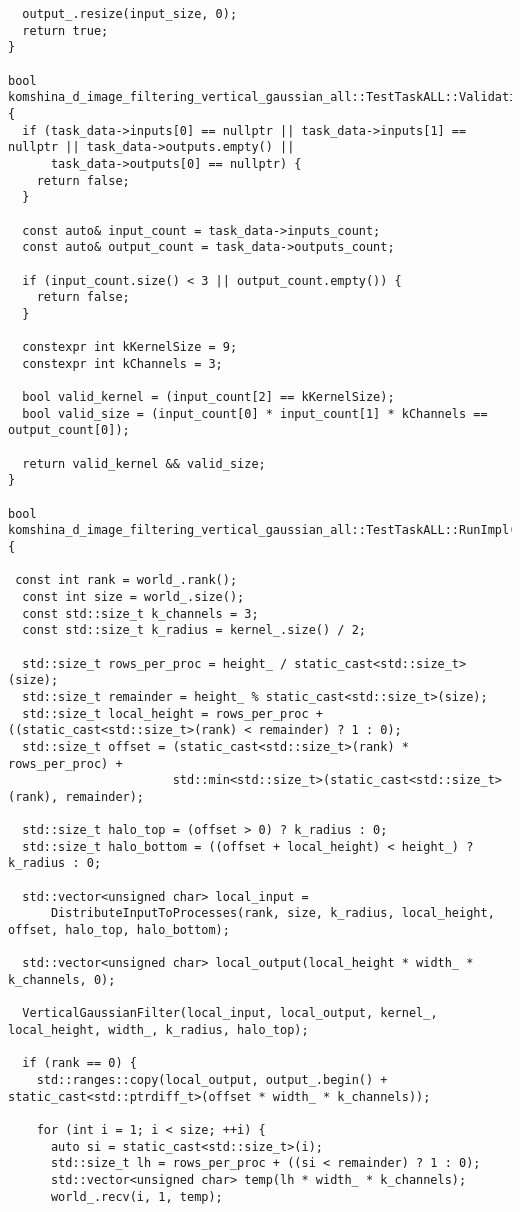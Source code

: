 \documentclass[12pt]{article}
\begin{document}
\begin{lstlisting}
  output_.resize(input_size, 0);
  return true;
}

bool komshina_d_image_filtering_vertical_gaussian_all::TestTaskALL::ValidationImpl() {
  if (task_data->inputs[0] == nullptr || task_data->inputs[1] == nullptr || task_data->outputs.empty() ||
      task_data->outputs[0] == nullptr) {
    return false;
  }

  const auto& input_count = task_data->inputs_count;
  const auto& output_count = task_data->outputs_count;

  if (input_count.size() < 3 || output_count.empty()) {
    return false;
  }

  constexpr int kKernelSize = 9;
  constexpr int kChannels = 3;

  bool valid_kernel = (input_count[2] == kKernelSize);
  bool valid_size = (input_count[0] * input_count[1] * kChannels == output_count[0]);

  return valid_kernel && valid_size;
}

bool komshina_d_image_filtering_vertical_gaussian_all::TestTaskALL::RunImpl() {

 const int rank = world_.rank();
  const int size = world_.size();
  const std::size_t k_channels = 3;
  const std::size_t k_radius = kernel_.size() / 2;

  std::size_t rows_per_proc = height_ / static_cast<std::size_t>(size);
  std::size_t remainder = height_ % static_cast<std::size_t>(size);
  std::size_t local_height = rows_per_proc + ((static_cast<std::size_t>(rank) < remainder) ? 1 : 0);
  std::size_t offset = (static_cast<std::size_t>(rank) * rows_per_proc) +
                       std::min<std::size_t>(static_cast<std::size_t>(rank), remainder);

  std::size_t halo_top = (offset > 0) ? k_radius : 0;
  std::size_t halo_bottom = ((offset + local_height) < height_) ? k_radius : 0;

  std::vector<unsigned char> local_input =
      DistributeInputToProcesses(rank, size, k_radius, local_height, offset, halo_top, halo_bottom);

  std::vector<unsigned char> local_output(local_height * width_ * k_channels, 0);

  VerticalGaussianFilter(local_input, local_output, kernel_, local_height, width_, k_radius, halo_top);

  if (rank == 0) {
    std::ranges::copy(local_output, output_.begin() + static_cast<std::ptrdiff_t>(offset * width_ * k_channels));

    for (int i = 1; i < size; ++i) {
      auto si = static_cast<std::size_t>(i);
      std::size_t lh = rows_per_proc + ((si < remainder) ? 1 : 0);
      std::vector<unsigned char> temp(lh * width_ * k_channels);
      world_.recv(i, 1, temp);


\end{lstlisting}
\end{document}
